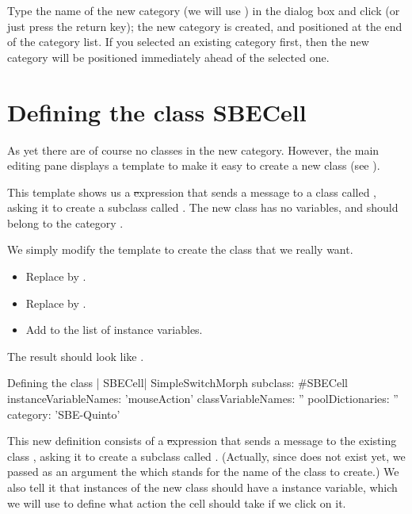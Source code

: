 \documentclass[a4paper,10pt,twoside]{book}
\begin{document}
Type the name of the new category (we will use ) in the dialog box and click  (or just press the return key); the new category is created, and positioned at the end of the category list.
If you selected an existing category first, then the new category will be positioned immediately ahead of the selected one.

\section{Defining the class SBECell}

As yet there are  of course no classes in the new category. However, the main editing pane displays a template to make it easy to create a new class (see ).

This template shows us a \st expression that sends a message to a class called , asking it to create a subclass called .  The new class has no variables, and should belong to the category .

We simply modify the template to create the class that we really want.

\begin{itemize}
  \item Replace  by .
  \item Replace  by .
  \item Add  to the list of instance variables.
\end{itemize}
The result should look like .

\begin{classdef}[firstClassDef]{Defining the class \ct| SBECell|}
SimpleSwitchMorph subclass: #SBECell
   instanceVariableNames: 'mouseAction'
   classVariableNames: ''
   poolDictionaries: ''
   category: 'SBE-Quinto'
\end{classdef}

This new definition consists of a \st expression that sends a message to the existing class , asking it to create a subclass called .
(Actually, since  does not exist yet, we passed as an argument the   which stands for the name of the class to create.)
We also tell it that instances of the new class should have a  instance variable, which we will use to define what action the cell should take if we click on it.
\end{document}
